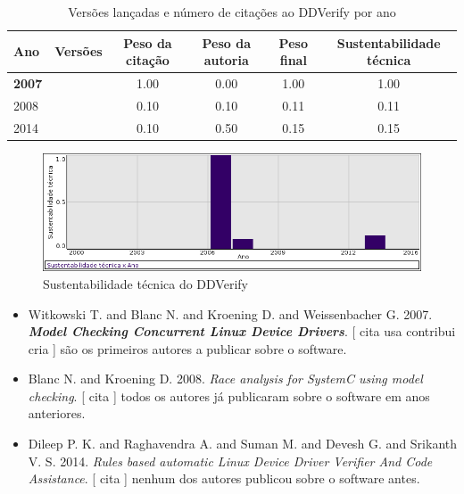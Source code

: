 \begin{table}[H]
\caption{Versões lançadas e número de citações ao DDVerify por ano}
\centering
\begin{tabular}{| l | c | c | c | c | c |}
  \hline
  Ano & Versões & Peso da citação & Peso da autoria & Peso final & Sustentabilidade técnica \\
  \hline
            {\bf 2007}
          &
          
          &
          1.00
          &
          0.00
          &
          1.00
          &
            {\color{blue} 1.00}
          \\
\hline
            2008
          &
          
          &
          0.10
          &
          0.10
          &
          0.11
          &
            {\color{red} 0.11}
          \\
\hline
            2014
          &
          
          &
          0.10
          &
          0.50
          &
          0.15
          &
            {\color{red} 0.15}
          \\
\hline
\end{tabular}
\end{table}

\begin{figure}[h]
  \center
  \includegraphics[scale=0.50]{imagens/softwares-charts/ddverify.png}
  \caption{Sustentabilidade técnica do DDVerify}
\end{figure}


\begin{itemize}
\item Witkowski T. and Blanc N. and Kroening D. and Weissenbacher G.
      2007.
        \textbf{\textit{ Model Checking Concurrent Linux Device Drivers}}.
      [
          cita
          usa
          contribui
          cria
      ]
são os primeiros autores a publicar sobre o software.
\item Blanc N. and Kroening D.
      2008.
        \textit{ Race analysis for SystemC using model checking}.
      [
          cita
      ]
todos os autores já publicaram sobre o software em anos anteriores.
\item Dileep P. K. and Raghavendra A. and Suman M. and Devesh G. and Srikanth V. S.
      2014.
        \textit{ Rules based automatic Linux Device Driver Verifier And Code Assistance}.
      [
          cita
      ]
nenhum dos autores publicou sobre o software antes.
\end{itemize}
